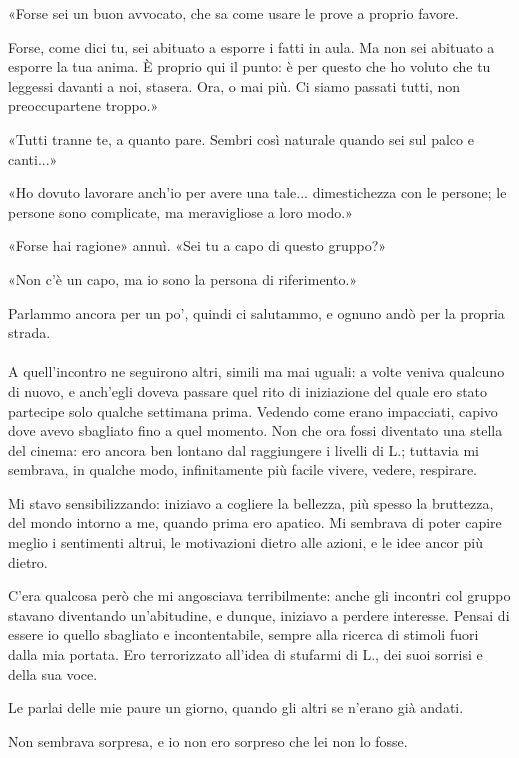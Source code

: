 \documentclass[a4paper,12pt]{book}
\begin{document}
«Forse sei un buon avvocato, che sa come usare le prove a proprio favore.

Forse, come dici tu, sei abituato a esporre i fatti in aula. Ma non sei abituato
a esporre la tua anima. È proprio qui il punto: è per questo che ho voluto che
tu leggessi davanti a noi, stasera. Ora, o mai più. Ci siamo passati tutti, non
preoccupartene troppo.»

«Tutti tranne te, a quanto pare. Sembri così naturale quando sei sul palco e
canti...»

«Ho dovuto lavorare anch’io per avere una tale... dimestichezza con le
persone; le persone sono complicate, ma meravigliose a loro modo.»

«Forse hai ragione» annuì. «Sei tu a capo di questo gruppo?»

«Non c’è un capo, ma io sono la persona di riferimento.»

Parlammo ancora per un po’, quindi ci salutammo, e ognuno andò per la propria
strada.

\paragraph{}
A quell’incontro ne seguirono altri, simili ma mai uguali: a volte veniva
qualcuno di nuovo, e anch’egli doveva passare quel rito di iniziazione del
quale ero stato partecipe solo qualche settimana prima. Vedendo come erano
impacciati, capivo dove avevo sbagliato fino a quel momento. Non che ora fossi
diventato una stella del cinema: ero ancora ben lontano dal raggiungere i
livelli di L.; tuttavia mi sembrava, in qualche modo, infinitamente più facile
vivere, vedere, respirare.

Mi stavo sensibilizzando: iniziavo a cogliere la bellezza, più spesso la
bruttezza, del mondo intorno a me, quando prima ero apatico. Mi sembrava di
poter capire meglio i sentimenti altrui, le motivazioni dietro alle azioni, e le
idee ancor più dietro.

C’era qualcosa però che mi angosciava terribilmente: anche gli incontri col
gruppo stavano diventando un’abitudine, e dunque, iniziavo a perdere
interesse. Pensai di essere io quello sbagliato e incontentabile, sempre alla
ricerca di stimoli fuori dalla mia portata. Ero terrorizzato all’idea di
stufarmi di L., dei suoi sorrisi e della sua voce.

Le parlai delle mie paure un giorno, quando gli altri se n’erano già andati.

Non sembrava sorpresa, e io non ero sorpreso che lei non lo fosse.
\end{document}

